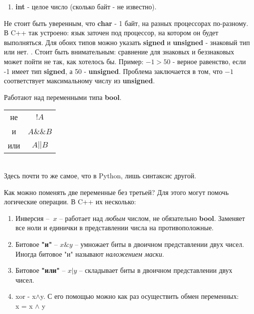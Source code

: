 \begin{lecture}[\lectureSubject]
\begin{lecSection}
\begin{enumerate}
			\item \textbf{int} - целое число (сколько байт - не известно).
		\end{enumerate}
		Не стоит быть уверенным, что \textbf{char} - 1 байт, на разных процессорах по-разному. В C++ так устроено: язык заточен под процессор, на котором он будет выполняться. Для обоих типов можно указать \textbf{signed} и \textbf{unsigned} - знаковый тип или нет.
		. Стоит быть внимательным: сравнение для знаковых и беззнаковых может пойти не так, как хотелось бы. Пример:
		$-1 > 50$ - верное равенство, если -1 имеет тип \textbf{signed}, а 50 - \textbf{unsigned}. Проблема заключается в том, что $-1$ соответствует максимальному числу из \textbf{unsigned}.
	\end{lecSection}
	\begin{lecSection}
		Работают над переменными типа \textbf{bool}.\\
		\begin{tabular}{cc}
			\multicolumn{1}{c|}{не} & $!A$ \\
			\multicolumn{1}{c|}{и} & $A\&\&B$ \\
			\multicolumn{1}{c|}{или} & $A || B$ \\
		\end{tabular}\\
		\vspace*{5pt}
		Здесь почти то же самое, что в Python, лишь синтаксис другой.
	\end{lecSection}
	\begin{lecSection}
		Как можно поменять две переменные без третьей? Для этого могут помочь логические операции. В C++ их несколько:
		\begin{enumerate}
			\item Инверсия -- $~x$ -- работает над \textit{любым} числом, не обязательно \textbf{bool}. Заменяет все ноли и единички в представлении числа на противоположные.
			\item Битовое \textbf{"и"} -- $x\& y$ -- умножает биты в двоичном представлении двух чисел. Иногда битовое "и" называют \textit{наложением маски}.
			\item Битовое \textbf{"или"} -- $x | y$ -- складывает биты в двоичном представлении двух чисел.
			\item xor - x$\wedge$y. С его помощью можно как раз осуществить обмен переменных: \\
			x = x $\wedge$ y \\

\end{enumerate}
\end{lecSection}
\end{lecture}
